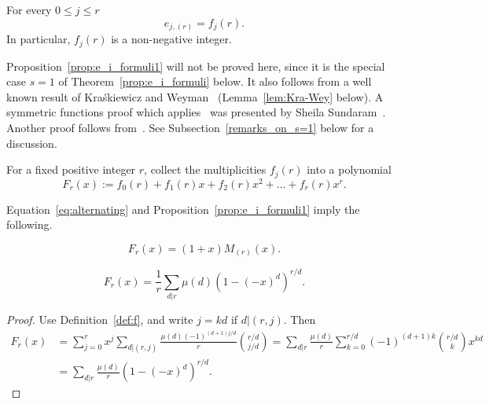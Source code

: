\documentclass[ALCO,published]{cedram}
\begin{document}
\begin{proposition}\label{prop:e_i_formuli1}
    For every $0\le j\le r$ 
    \[
        e_{j,(r)} = f_j(r).
    \]
    In particular, $f_j(r)$ is a non-negative integer.
\end{proposition}

\begin{remark}\label{rem:e=s}
    Proposition~\ref{prop:e_i_formuli1} will not be proved here, since it is the special case $s=1$ of Theorem~\ref{prop:e_i_formuli} below. 
    It also follows from a well known result of Kra\'skiewicz and Weyman~\cite{KraskiewiczWeyman} (Lemma~\ref{lem:Kra-Wey} below).
    A symmetric functions proof which applies~\cite[Lemma 2.7]{Sundaram_Adv} was presented by Sheila Sundaram~\cite{Sundaram_personal}. 
    Another proof follows from~\cite[Theorem 3.1]{ET}. 
    See Subsection~\ref{remarks_on_s=1} below for a discussion.
\end{remark}
  
\begin{definition}\label{def:F_polynomial}
    For a fixed positive integer $r$, collect the multiplicities $f_j(r)$ into a polynomial
    \[
	    F_r(x) := f_0(r) + f_1(r)x + f_2(r)x^2+ \ldots + f_r(r)x^r.
    \]
\end{definition}

Equation~\eqref{eq:alternating} and Proposition~\ref{prop:e_i_formuli1} imply the following. 

\begin{corollary}\label{t:F_and_M}
    \[
        F_r(x) = (1+x) M_{(r)}(x).
    \]
\end{corollary}

\begin{observation}\label{t:F}
    \[
        F_r(x) = \frac{1}{r} \sum_{d|r} \mu(d) (1-(-x)^d)^{r/d}.
    \]
\end{observation}

\begin{proof}
    Use Definition~\ref{def:f}, and write $j = kd$ if $d | (r,j)$. Then
    \begin{align*}
        F_r(x) 
        &= \sum_{j=0}^{r} x^j \sum_{d|(r,j)} \frac{\mu(d) (-1)^{(d+1)j/d}}{r} \binom{r/d}{j/d} 
        = \sum_{d|r} \frac{\mu(d)}{r} \sum_{k=0}^{r/d} (-1)^{(d+1)k} \binom{r/d}{k}x^{k d} \\
        &= \sum_{d|r} \frac{\mu(d)}{r} (1-(-x)^d)^{r/d}.
    \end{align*}

\end{proof}
	
\end{document}
